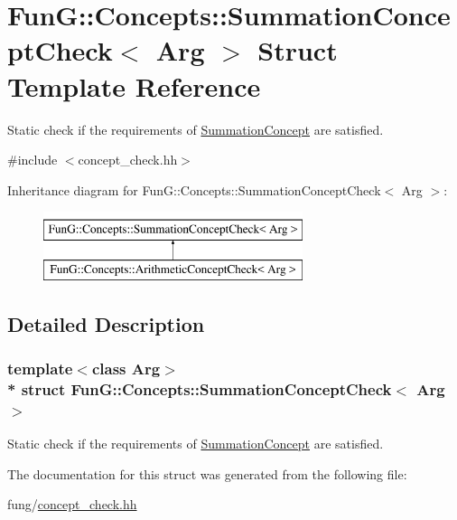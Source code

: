 \hypertarget{structFunG_1_1Concepts_1_1SummationConceptCheck}{}\section{FunG\+:\+:Concepts\+:\+:Summation\+Concept\+Check$<$ Arg $>$ Struct Template Reference}
\label{structFunG_1_1Concepts_1_1SummationConceptCheck}


Static check if the requirements of \hyperlink{structFunG_1_1Concepts_1_1SummationConcept}{Summation\+Concept} are satisfied.  




{\ttfamily \#include $<$concept\+\_\+check.\+hh$>$}

Inheritance diagram for FunG\+:\+:Concepts\+:\+:Summation\+Concept\+Check$<$ Arg $>$\+:\begin{figure}[H]
\begin{center}
\leavevmode
\includegraphics[height=2.000000cm]{structFunG_1_1Concepts_1_1SummationConceptCheck}
\end{center}
\end{figure}


\subsection{Detailed Description}
\subsubsection*{template$<$class Arg$>$\\*
struct Fun\+G\+::\+Concepts\+::\+Summation\+Concept\+Check$<$ Arg $>$}

Static check if the requirements of \hyperlink{structFunG_1_1Concepts_1_1SummationConcept}{Summation\+Concept} are satisfied. 

The documentation for this struct was generated from the following file\+:\begin{DoxyCompactItemize}
\item 
fung/\hyperlink{concept__check_8hh}{concept\+\_\+check.\+hh}\end{DoxyCompactItemize}

